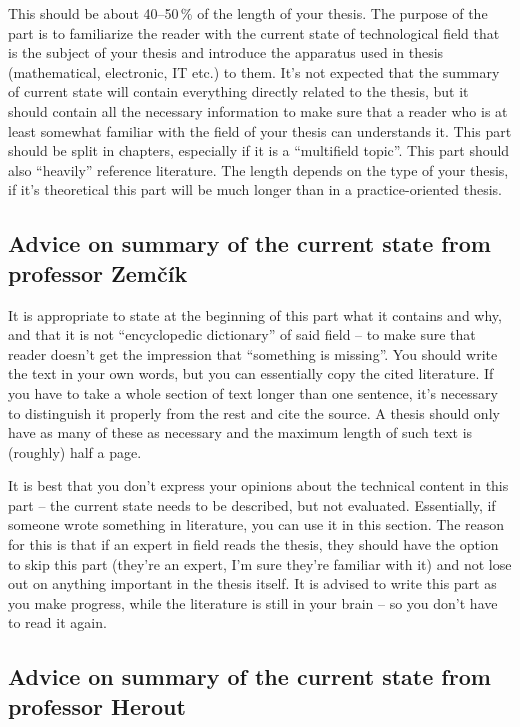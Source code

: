 {{This should be about 40--50\,\% of the length of your thesis. The purpose of the part is to familiarize the reader with the current state of technological field that is the subject of your thesis and introduce the apparatus used in thesis (mathematical, electronic, IT etc.) to them. It's not expected that the summary of current state will contain everything directly related to the thesis, but it should contain all the necessary information to make sure that a reader who is at least somewhat familiar with the field of your thesis can understands it. This part should be split in chapters, especially if it is a ``multifield topic''. This part should also ``heavily'' reference literature. The length depends on the type of your thesis, if it's theoretical this part will be much longer than in a practice-oriented thesis.

\subsection*{Advice on summary of the current state from professor Zemčík}

It is appropriate to state at the beginning of this part what it contains and why, and that it is not ``encyclopedic dictionary'' of said field -- to make sure that reader doesn't get the impression that ``something is missing''. You should write the text in your own words, but you can essentially copy the cited literature. If you have to take a whole section of text longer than one sentence, it's necessary to distinguish it properly from the rest and cite the source. A thesis should only have as many of these as necessary and the maximum length of such text is (roughly) half a page.

It is best that you don't express your opinions about the technical content in this part -- the current state needs to be described, but not evaluated. Essentially, if someone wrote something in literature, you can use it in this section. The reason for this is that if an expert in field reads the thesis, they should have the option to skip this part (they're an expert, I'm sure they're familiar with it) and not lose out on anything important in the thesis itself. It is advised to write this part as you make progress, while the literature is still in your brain -- so you don't have to read it again.


\subsection*{Advice on summary of the current state from professor Herout}

}}
